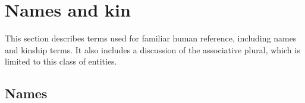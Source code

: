 %




%


\section{Names and kin}

This section describes terms used for familiar human reference, including names and kinship terms. It also includes a discussion of the associative plural, which is limited to this class of entities.

\subsection{Names}\label{sec:ch6:names}

